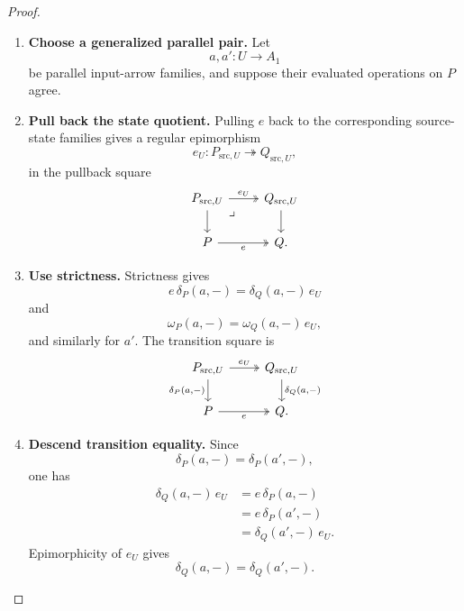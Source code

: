 \begin{proof}
    \leavevmode
    \begin{enumerate}
        \item \textbf{Choose a generalized parallel pair.}
        Let
        \[
            a,a':U\to A_1
        \]
        be parallel input-arrow families, and suppose their evaluated
        operations on \(P\) agree.

        \item \textbf{Pull back the state quotient.}
        Pulling \(e\) back to the corresponding source-state families gives a
        regular epimorphism
        \[
            e_U:
            P_{\mathrm{src},U}
            \twoheadrightarrow
            Q_{\mathrm{src},U},
        \]
        in the pullback square
        \[
        \begin{tikzcd}
            P_{\mathrm{src},U}
                \arrow[r, two heads, "e_U"]
                \arrow[d]
                \arrow[dr, phantom, "\lrcorner", very near start]
            &
            Q_{\mathrm{src},U}
                \arrow[d]
            \\
            P
                \arrow[r, two heads, "e"']
            &
            Q.
        \end{tikzcd}
        \]

        \item \textbf{Use strictness.}
        Strictness gives
        \[
            e\,\delta_P(a,-)
            =
            \delta_Q(a,-)\,e_U
        \]
        and
        \[
            \omega_P(a,-)
            =
            \omega_Q(a,-)\,e_U,
        \]
        and similarly for \(a'\). The transition square is
        \[
        \begin{tikzcd}
            P_{\mathrm{src},U}
                \arrow[r, two heads, "e_U"]
                \arrow[d, "{\delta_P(a,-)}"']
            &
            Q_{\mathrm{src},U}
                \arrow[d, "{\delta_Q(a,-)}"]
            \\
            P
                \arrow[r, two heads, "e"']
            &
            Q.
        \end{tikzcd}
        \]

        \item \textbf{Descend transition equality.}
        Since
        \[
            \delta_P(a,-)=\delta_P(a',-),
        \]
        one has
        \[
        \begin{aligned}
            \delta_Q(a,-)\,e_U
            &=
            e\,\delta_P(a,-)
            \\
            &=
            e\,\delta_P(a',-)
            \\
            &=
            \delta_Q(a',-)\,e_U.
        \end{aligned}
        \]
        Epimorphicity of \(e_U\) gives
        \[
            \delta_Q(a,-)=\delta_Q(a',-).
        \]


\end{enumerate}
\end{proof}
